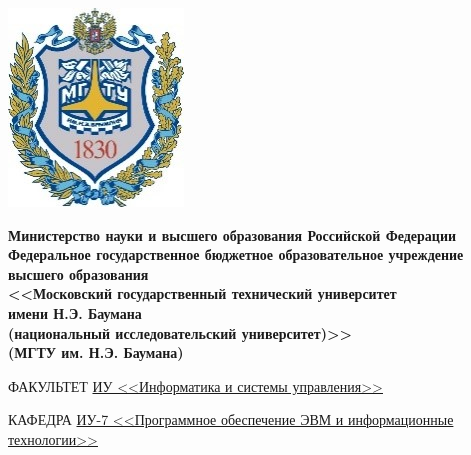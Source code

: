 \begin{titlepage}
	\noindent\begin{minipage}{0.05\textwidth}
		\includegraphics[scale=1.5]{img/b_logo.jpg}
	\end{minipage}
	\hfill
	\begin{minipage}{0.85\textwidth}\raggedleft
		\begin{center}
			\fontsize{12pt}{0.3\baselineskip}\selectfont \textbf{Министерство науки и высшего образования Российской Федерации \\ Федеральное государственное бюджетное образовательное учреждение \\ высшего образования \\ <<Московский государственный технический университет \\ имени Н.Э. Баумана \\ (национальный исследовательский университет)>> \\ (МГТУ им. Н.Э. Баумана)}
		\end{center}
	\end{minipage}
	
	\begin{center}
		\fontsize{12pt}{0.1\baselineskip}\selectfont
		\noindent\makebox[\linewidth]{\rule{\textwidth}{4pt}} \makebox[\linewidth]{\rule{\textwidth}{1pt}}
	\end{center}
	
	\begin{flushleft}
		\fontsize{12pt}{0.8\baselineskip}\selectfont 
		
		ФАКУЛЬТЕТ \uline{ИУ <<Информатика и системы управления>> \hfill}
		
		КАФЕДРА \uline{\mbox{\hspace{4mm}} ИУ-7 <<Программное обеспечение ЭВМ и информационные технологии>> \hfill}
	\end{flushleft}
	
	\vfill
	
	\begin{center}
		\fontsize{20pt}{\baselineskip}\selectfont
		

\end{center}
\end{titlepage}
